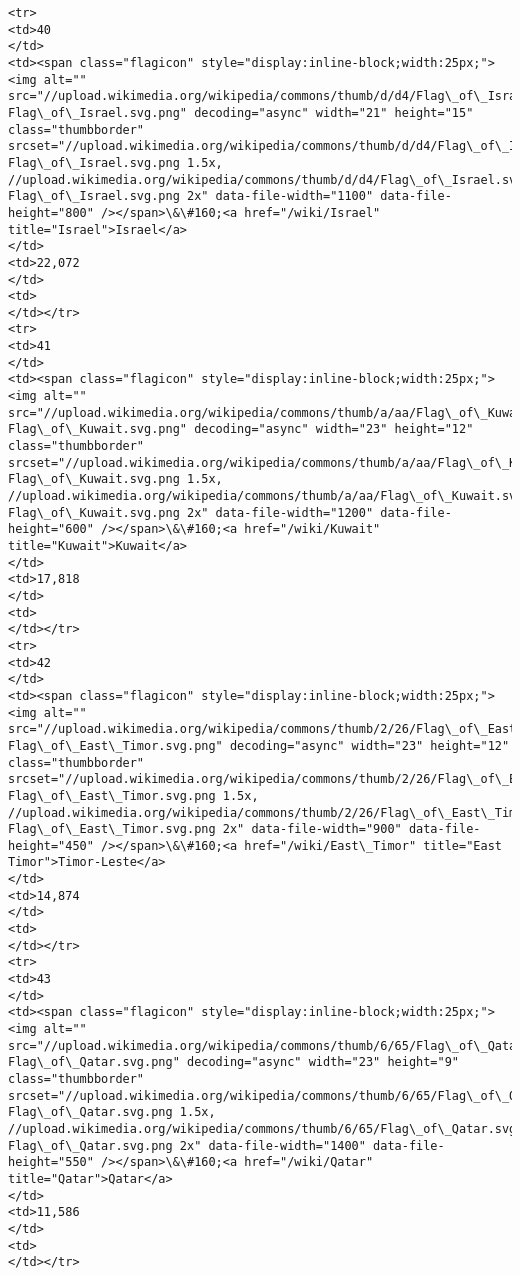 \documentclass[11pt]{article}
\begin{document}
\begin{Verbatim}[commandchars=\\\{\}]
<tr>
<td>40
</td>
<td><span class="flagicon" style="display:inline-block;width:25px;"><img alt="" src="//upload.wikimedia.org/wikipedia/commons/thumb/d/d4/Flag\_of\_Israel.svg/21px-Flag\_of\_Israel.svg.png" decoding="async" width="21" height="15" class="thumbborder" srcset="//upload.wikimedia.org/wikipedia/commons/thumb/d/d4/Flag\_of\_Israel.svg/32px-Flag\_of\_Israel.svg.png 1.5x, //upload.wikimedia.org/wikipedia/commons/thumb/d/d4/Flag\_of\_Israel.svg/41px-Flag\_of\_Israel.svg.png 2x" data-file-width="1100" data-file-height="800" /></span>\&\#160;<a href="/wiki/Israel" title="Israel">Israel</a>
</td>
<td>22,072
</td>
<td>
</td></tr>
<tr>
<td>41
</td>
<td><span class="flagicon" style="display:inline-block;width:25px;"><img alt="" src="//upload.wikimedia.org/wikipedia/commons/thumb/a/aa/Flag\_of\_Kuwait.svg/23px-Flag\_of\_Kuwait.svg.png" decoding="async" width="23" height="12" class="thumbborder" srcset="//upload.wikimedia.org/wikipedia/commons/thumb/a/aa/Flag\_of\_Kuwait.svg/35px-Flag\_of\_Kuwait.svg.png 1.5x, //upload.wikimedia.org/wikipedia/commons/thumb/a/aa/Flag\_of\_Kuwait.svg/46px-Flag\_of\_Kuwait.svg.png 2x" data-file-width="1200" data-file-height="600" /></span>\&\#160;<a href="/wiki/Kuwait" title="Kuwait">Kuwait</a>
</td>
<td>17,818
</td>
<td>
</td></tr>
<tr>
<td>42
</td>
<td><span class="flagicon" style="display:inline-block;width:25px;"><img alt="" src="//upload.wikimedia.org/wikipedia/commons/thumb/2/26/Flag\_of\_East\_Timor.svg/23px-Flag\_of\_East\_Timor.svg.png" decoding="async" width="23" height="12" class="thumbborder" srcset="//upload.wikimedia.org/wikipedia/commons/thumb/2/26/Flag\_of\_East\_Timor.svg/35px-Flag\_of\_East\_Timor.svg.png 1.5x, //upload.wikimedia.org/wikipedia/commons/thumb/2/26/Flag\_of\_East\_Timor.svg/46px-Flag\_of\_East\_Timor.svg.png 2x" data-file-width="900" data-file-height="450" /></span>\&\#160;<a href="/wiki/East\_Timor" title="East Timor">Timor-Leste</a>
</td>
<td>14,874
</td>
<td>
</td></tr>
<tr>
<td>43
</td>
<td><span class="flagicon" style="display:inline-block;width:25px;"><img alt="" src="//upload.wikimedia.org/wikipedia/commons/thumb/6/65/Flag\_of\_Qatar.svg/23px-Flag\_of\_Qatar.svg.png" decoding="async" width="23" height="9" class="thumbborder" srcset="//upload.wikimedia.org/wikipedia/commons/thumb/6/65/Flag\_of\_Qatar.svg/35px-Flag\_of\_Qatar.svg.png 1.5x, //upload.wikimedia.org/wikipedia/commons/thumb/6/65/Flag\_of\_Qatar.svg/46px-Flag\_of\_Qatar.svg.png 2x" data-file-width="1400" data-file-height="550" /></span>\&\#160;<a href="/wiki/Qatar" title="Qatar">Qatar</a>
</td>
<td>11,586
</td>
<td>
</td></tr>

\end{Verbatim}
\end{document}
